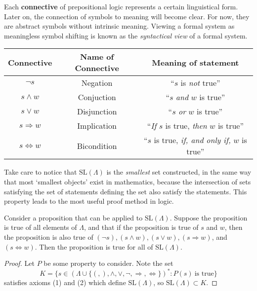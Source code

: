 Each {\bf connective} of prepositional logic represents a certain linguistical form. Later on, the connection of symbols to meaning will become clear. For now, they are abstract symbols without intrinsic meaning. Viewing a formal system as meaningless symbol shifting is known as the {\it syntactical view} of a formal system.
%
\begin{center}
\begin{tabular}{| c | c | c |}
    \hline Connective & Name of Connective & Meaning of statement \\
    \hline $\neg s$ & Negation & ``$s$ is {\it not} true''\\
    $s \wedge w$ & Conjuction & ``$s$ {\it and} $w$ is true''\\
    $s \vee w$ & Disjunction & ``$s$ {\it or} $w$ is true''\\
    $s \Rightarrow w$ & Implication & ``{\it If} $s$ is true, {\it then} $w$ is true''\\
    $s \Leftrightarrow w$ & Bicondition & ``$s$ is true, {\it if, and only if,} $w$ is true''\\
    \hline
\end{tabular}
\end{center}

Take care to notice that $\text{SL}(\Lambda)$ is the {\it smallest} set constructed, in the same way that most `smallest objects' exist in mathematics, because the intersection of sets satisfying the set of statements defining the set also satisfy the statements. This property leads to the most useful proof method in logic.

\begin{theorem}
    Consider a proposition that can be applied to $\text{SL}(\Lambda)$. Suppose the proposition is true of all elements of $\Lambda$, and that if the proposition is true of $s$ and $w$, then the proposition is also true of $(\neg s), (s \wedge w), (s \vee w), (s \Rightarrow w)$, and $(s \Leftrightarrow w)$. Then the proposition is true for all of $\text{SL}(\Lambda)$.
\end{theorem}
\begin{proof}
    Let $P$ be some property to consider. Note the set
    \[ K = \{ s \in (\Lambda \cup \{ (, ), \wedge, \vee, \neg, \Rightarrow, \Leftrightarrow \})^* : P(s)\ \text{is true} \} \]
    satisfies axioms (1) and (2) which define $\text{SL}(\Lambda)$, so $\text{SL}(\Lambda) \subset K$.
\end{proof}

